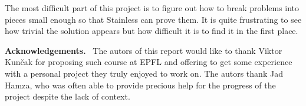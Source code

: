 \documentclass[a4paper,UKenglish,cleveref, autoref, thm-restate]{lipics-v2021}
\begin{document}
The most difficult part of this project is to figure out how to break problems into pieces small enough so that Stainless can prove them. 
It is quite frustrating to see how trivial the solution appears but how difficult it is to find it in the first place.


\vspace{0.5cm} %
\noindent %
\textbf{\large Acknowledgements.}\ %
The autors of this report would like to thank Viktor Kun\v{c}ak for proposing such course at EPFL and offering to get some experience with a personal project they truly enjoyed to work on. The autors thank Jad Hamza, who was often able to provide precious help for the progress of the project despite the lack of context.


\end{document}

